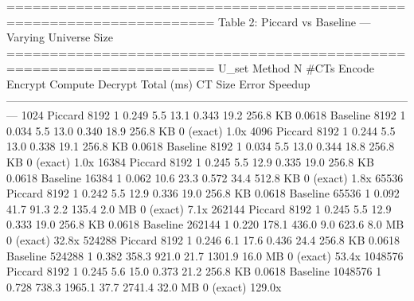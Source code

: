 ======================================================================
  Table 2: Piccard vs Baseline — Varying Universe Size
======================================================================
    U_set    Method        N  #CTs  Encode  Encrypt  Compute  Decrypt  Total (ms)   CT Size      Error  Speedup
---------------------------------------------------------------------------------------------------------------
     1024   Piccard     8192     1   0.249      5.5     13.1    0.343        19.2  256.8 KB     0.0618         
           Baseline     8192     1   0.034      5.5     13.0    0.340        18.9  256.8 KB  0 (exact)     1.0x
     4096   Piccard     8192     1   0.244      5.5     13.0    0.338        19.1  256.8 KB     0.0618         
           Baseline     8192     1   0.034      5.5     13.0    0.344        18.8  256.8 KB  0 (exact)     1.0x
    16384   Piccard     8192     1   0.245      5.5     12.9    0.335        19.0  256.8 KB     0.0618         
           Baseline    16384     1   0.062     10.6     23.3    0.572        34.4  512.8 KB  0 (exact)     1.8x
    65536   Piccard     8192     1   0.242      5.5     12.9    0.336        19.0  256.8 KB     0.0618         
           Baseline    65536     1   0.092     41.7     91.3      2.2       135.4    2.0 MB  0 (exact)     7.1x
   262144   Piccard     8192     1   0.245      5.5     12.9    0.333        19.0  256.8 KB     0.0618         
           Baseline   262144     1   0.220    178.1    436.0      9.0       623.6    8.0 MB  0 (exact)    32.8x
   524288   Piccard     8192     1   0.246      6.1     17.6    0.436        24.4  256.8 KB     0.0618         
           Baseline   524288     1   0.382    358.3    921.0     21.7      1301.9   16.0 MB  0 (exact)    53.4x
  1048576   Piccard     8192     1   0.245      5.6     15.0    0.373        21.2  256.8 KB     0.0618         
           Baseline  1048576     1   0.728    738.3   1965.1     37.7      2741.4   32.0 MB  0 (exact)   129.0x

